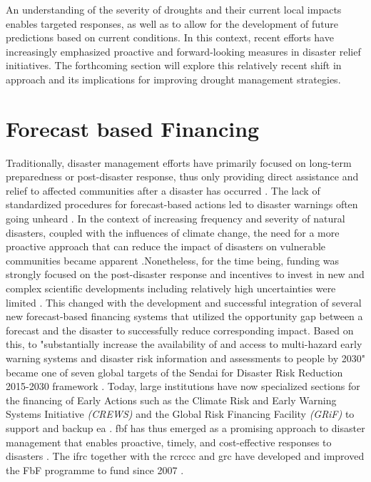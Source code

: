 An understanding of the severity of droughts and their current local impacts enables targeted responses, as well as to allow for the development of future predictions based on current conditions. In this context, recent efforts have increasingly emphasized proactive and forward-looking measures in disaster relief initiatives. The forthcoming section will explore this relatively recent shift in approach and its implications for improving drought management strategies.


\section{Forecast based Financing}\label{sec:fbf}

Traditionally, disaster management efforts have primarily focused on long-term preparedness or post-disaster response, thus only providing direct assistance and relief to affected communities after a disaster has occurred \autocite{coughlandeperezForecastbasedFinancingApproach2015,unisdrHyogoFrameworkAction2005}. The lack of standardized procedures for forecast-based actions led to disaster warnings often going unheard \autocite{kolenImpactsStormXynthia2013}. In the context of increasing frequency and severity of natural disasters, coupled with the influences of climate change, the need for a more proactive approach that can reduce the impact of disasters on vulnerable communities became apparent \autocite{coughlandeperezForecastbasedFinancingApproach2015,trisosAfrica2022}.\newline Nonetheless, for the time being, funding was strongly focused on the post-disaster response and incentives to invest in new and complex scientific developments including relatively high uncertainties were limited \autocite{coughlandeperezActionbasedFloodForecasting2016}. This changed with the development and successful integration of several new forecast-based financing systems that utilized the opportunity gap between a forecast and the disaster to successfully reduce corresponding impact. Based on this, to "substantially increase the availability of and access to multi-hazard early warning systems and disaster risk information and assessments to people by 2030" became one of seven global targets of the Sendai for Disaster Risk Reduction 2015-2030 framework \autocites{coughlandeperezActionbasedFloodForecasting2016}[12]{undrrSendaiFrameworkDisaster}. Today, large institutions have now specialized sections for the financing of Early Actions such as the Climate Risk and Early Warning Systems Initiative \textit{(CREWS)} and the Global Risk Financing Facility \textit{(GRiF)} to support and backup \acrlong{ea} \autocite{crewsClimateRiskEarly,GlobalRiskFinancing}. \acrlong{fbf} has thus emerged as a promising approach to disaster management that enables proactive, timely, and cost-effective responses to disasters \autocite{coughlandeperezForecastbasedFinancingApproach2015,grcFORECASTBASEDFINANCINGInnovative2017}. The \acrfull{ifrc} together with the \acrfull{rcrccc} and \acrfull{grc} have developed and improved the FbF programme to fund  since 2007 \autocite{ifrcForecastbasedFinancingNew2019}. 

